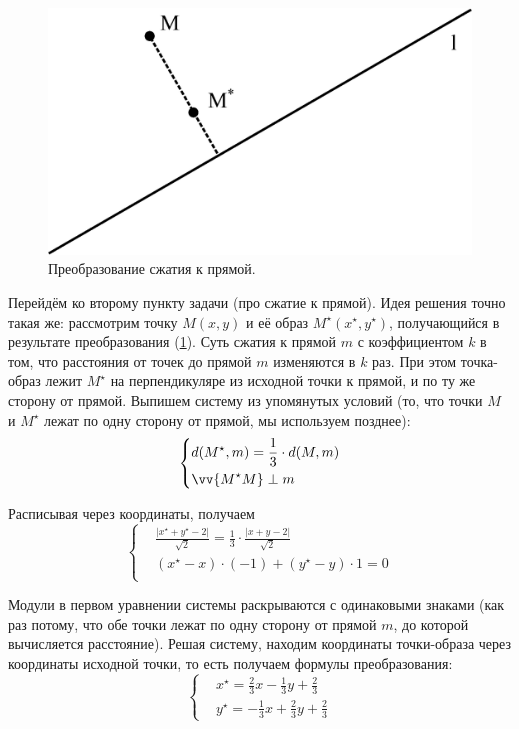 \documentclass[a4paper,12pt]{article}
\begin{document}
\begin{solution}
    \bigskip
    
    \begin{figure}
      \centering
      
      \includegraphics[width=0.5\columnwidth]{compressione-linea}
      
      \caption{Преобразование сжатия к прямой.}
      \label{fig:compressione-linea}
    \end{figure}
    
    Перейдём ко второму пункту задачи (про сжатие к прямой).
    Идея решения точно такая же: рассмотрим точку $M(x, y)$ и её образ $M^\star(x^\star, y^\star)$, получающийся в результате преобразования (\ref{fig:compressione-linea}).
    Суть сжатия к прямой $m$ с коэффициентом $k$ в том, что расстояния от точек до прямой $m$ изменяются в $k$ раз.
    При этом точка-образ лежит $M^\star$ на перпендикуляре из исходной точки к прямой, и по ту же сторону от прямой.
    Выпишем систему из упомянутых условий (то, что точки $M$ и $M^\star$ лежат по одну сторону от прямой, мы используем позднее):
    \[
      \left\{
        \begin{aligned}
          &d(M^\star, m) = \frac{1}{3} \cdot d(M, m)\\
          &\vv{M^\star M} \perp m\\
        \end{aligned}
      \right.
    \]
    
    Расписывая через координаты, получаем
    \[
      \left\{
        \begin{aligned}
          &\frac{|x^\star + y^\star - 2|}{\sqrt{2}} = \frac{1}{3} \cdot \frac{|x + y - 2|}{\sqrt{2}}\\
          &(x^\star - x) \cdot (-1) + (y^\star - y) \cdot 1 = 0\\
        \end{aligned}
      \right.
    \]
    
    Модули в первом уравнении системы раскрываются с одинаковыми знаками (как раз потому, что обе точки лежат по одну сторону от прямой $m$, до которой вычисляется расстояние).
    Решая систему, находим координаты точки-образа через координаты исходной точки, то есть получаем формулы преобразования:
    \[
      \left\{
        \begin{aligned}
          &x^\star = \frac{2}{3}x - \frac{1}{3}y + \frac{2}{3}\\
          &y^\star = -\frac{1}{3}x + \frac{2}{3}y + \frac{2}{3}
        \end{aligned}
      \right.
    \]
  \end{solution}
  
\end{document}
